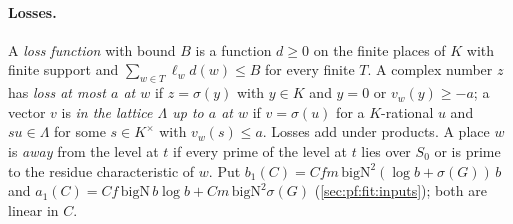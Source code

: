 \paragraph{Losses.} A \emph{loss function} with bound $B$ is a function $d\ge0$ on the finite places of $K$ with finite support
and $\sum_{w\in T}\ell_wd(w)\le B$ for every finite $T$. A complex number $z$ has \emph{loss at most $a$ at $w$} if $z=\sigma(y)$
with $y\in K$ and $y=0$ or $v_w(y)\ge-a$; a vector $v$ is \emph{in the lattice $\Lambda$ up to $a$ at $w$} if $v=\sigma(u)$ for a
$K$-rational $u$ and $su\in\Lambda$ for some $s\in K^\times$ with $v_w(s)\le a$. Losses add under products. A place $w$ is
\emph{away} from the level at $t$ if every prime of the level at $t$ lies over $S_0$ or is prime to the residue characteristic of
$w$. Put $b_1(C)=Cfm\,\mathrm{bigN}^2(\log b+\sigma(G))\,b$ and $a_1(C)=Cf\,\mathrm{bigN}\,b\log b+Cm\,\mathrm{bigN}^2\sigma(G)$
(\cref{sec:pf:fit:inputs}); both are linear in $C$.

